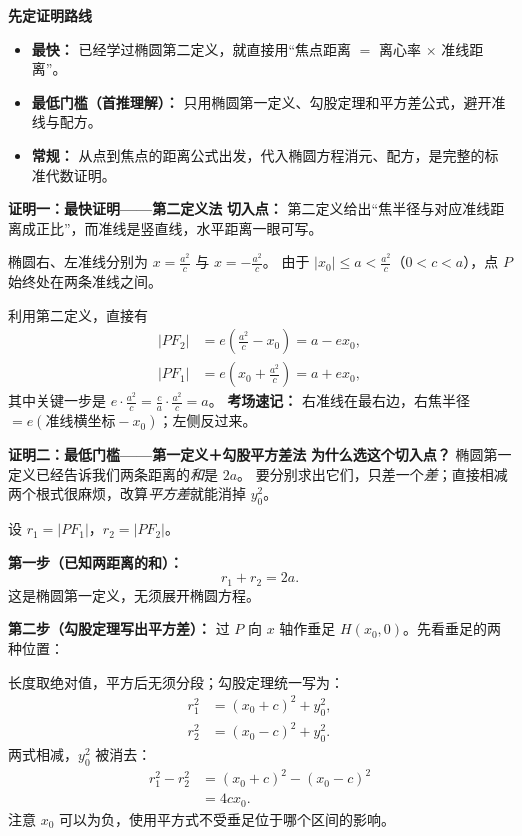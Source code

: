 \clearpage
\begin{proofbox}
\textbf{\textcolor{CProof}{先定证明路线}}
\begin{itemize}[leftmargin=*, itemsep=0.3em, topsep=0.3em]
 \item \textbf{最快：} 已经学过椭圆第二定义，就直接用“焦点距离 $=$ 离心率 $\times$ 准线距离”。
 \item \textbf{最低门槛（首推理解）：} 只用椭圆第一定义、勾股定理和平方差公式，避开准线与配方。
 \item \textbf{常规：} 从点到焦点的距离公式出发，代入椭圆方程消元、配方，是完整的标准代数证明。
\end{itemize}

\medskip
\textbf{\textcolor{CProof}{证明一：最快证明——第二定义法}}
\textbf{切入点：} 第二定义给出“焦半径与对应准线距离成正比”，而准线是竖直线，水平距离一眼可写。

椭圆右、左准线分别为 $x=\frac{a^2}{c}$ 与 $x=-\frac{a^2}{c}$。
由于 $|x_0|\le a<\frac{a^2}{c}$（$0<c<a$），点 $P$ 始终处在两条准线之间。

利用第二定义，直接有
\[
 \begin{aligned}
 |PF_2|&=e\left(\frac{a^2}{c}-x_0\right)=a-ex_0,\\
 |PF_1|&=e\left(x_0+\frac{a^2}{c}\right)=a+ex_0,
 \end{aligned}
\]
其中关键一步是 $e\cdot\frac{a^2}{c}=\frac ca\cdot\frac{a^2}{c}=a$。
\textbf{考场速记：} 右准线在最右边，右焦半径 $=e(\text{准线横坐标}-x_0)$；左侧反过来。

\end{proofbox}
\clearpage
\begin{proofbox}
\textbf{\textcolor{CProof}{证明二：最低门槛——第一定义＋勾股平方差法}}
\textbf{为什么选这个切入点？} 椭圆第一定义已经告诉我们两条距离的\emph{和}是 $2a$。
要分别求出它们，只差一个\emph{差}；直接相减两个根式很麻烦，改算\emph{平方差}就能消掉 $y_0^2$。

设 $r_1=|PF_1|$，$r_2=|PF_2|$。

\textbf{第一步（已知两距离的和）：}
\[
 r_1+r_2=2a.
\]
这是椭圆第一定义，无须展开椭圆方程。

\textbf{第二步（勾股定理写出平方差）：}
过 $P$ 向 $x$ 轴作垂足 $H(x_0,0)$。先看垂足的两种位置：

长度取绝对值，平方后无须分段；勾股定理统一写为：
\[
 \begin{aligned}
 r_1^2&=(x_0+c)^2+y_0^2,\\
 r_2^2&=(x_0-c)^2+y_0^2.
 \end{aligned}
\]
两式相减，$y_0^2$ 被消去：
\[
 \begin{aligned}
 r_1^2-r_2^2
 &=(x_0+c)^2-(x_0-c)^2\\
 &=4cx_0.
 \end{aligned}
\]
注意 $x_0$ 可以为负，使用平方式不受垂足位于哪个区间的影响。

\end{proofbox}
